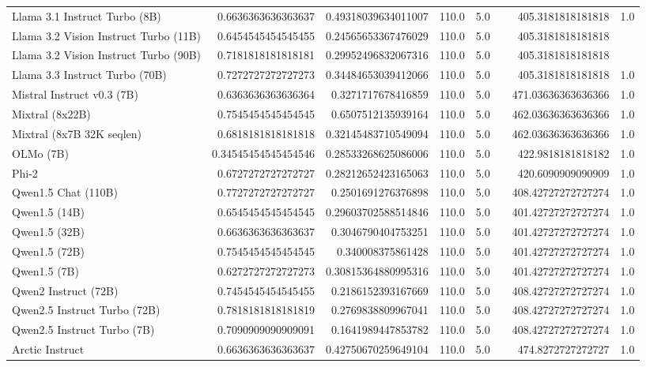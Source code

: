\begin{table}[htp]
{\begin{tabular}{lrrrrrrr}
Llama 3.1 Instruct Turbo (8B) & 0.6636363636363637 & 0.49318039634011007 & 110.0 & 5.0 &  & 405.3181818181818 & 1.0 \\
Llama 3.2 Vision Instruct Turbo (11B) & 0.6454545454545455 & 0.24565653367476029 & 110.0 & 5.0 &  & 405.3181818181818 &  \\
Llama 3.2 Vision Instruct Turbo (90B) & 0.7181818181818181 & 0.29952496832067316 & 110.0 & 5.0 &  & 405.3181818181818 &  \\
Llama 3.3 Instruct Turbo (70B) & 0.7272727272727273 & 0.34484653039412066 & 110.0 & 5.0 &  & 405.3181818181818 & 1.0 \\
Mistral Instruct v0.3 (7B) & 0.6363636363636364 & 0.3271717678416859 & 110.0 & 5.0 &  & 471.03636363636366 & 1.0 \\
Mixtral (8x22B) & 0.7545454545454545 & 0.6507512135939164 & 110.0 & 5.0 &  & 462.03636363636366 & 1.0 \\
Mixtral (8x7B 32K seqlen) & 0.6818181818181818 & 0.32145483710549094 & 110.0 & 5.0 &  & 462.03636363636366 & 1.0 \\
OLMo (7B) & 0.34545454545454546 & 0.28533268625086006 & 110.0 & 5.0 &  & 422.9818181818182 & 1.0 \\
Phi-2 & 0.6727272727272727 & 0.28212652423165063 & 110.0 & 5.0 &  & 420.6090909090909 & 1.0 \\
Qwen1.5 Chat (110B) & 0.7727272727272727 & 0.2501691276376898 & 110.0 & 5.0 &  & 408.42727272727274 & 1.0 \\
Qwen1.5 (14B) & 0.6545454545454545 & 0.29603702588514846 & 110.0 & 5.0 &  & 401.42727272727274 & 1.0 \\
Qwen1.5 (32B) & 0.6636363636363637 & 0.3046790404753251 & 110.0 & 5.0 &  & 401.42727272727274 & 1.0 \\
Qwen1.5 (72B) & 0.7545454545454545 & 0.340008375861428 & 110.0 & 5.0 &  & 401.42727272727274 & 1.0 \\
Qwen1.5 (7B) & 0.6272727272727273 & 0.30815364880995316 & 110.0 & 5.0 &  & 401.42727272727274 & 1.0 \\
Qwen2 Instruct (72B) & 0.7454545454545455 & 0.2186152393167669 & 110.0 & 5.0 &  & 408.42727272727274 & 1.0 \\
Qwen2.5 Instruct Turbo (72B) & 0.7818181818181819 & 0.2769838809967041 & 110.0 & 5.0 &  & 408.42727272727274 & 1.0 \\
Qwen2.5 Instruct Turbo (7B) & 0.7090909090909091 & 0.1641989447853782 & 110.0 & 5.0 &  & 408.42727272727274 & 1.0 \\
Arctic Instruct & 0.6636363636363637 & 0.42750670259649104 & 110.0 & 5.0 &  & 474.8272727272727 & 1.0 \\

\end{tabular}}
\end{table}
